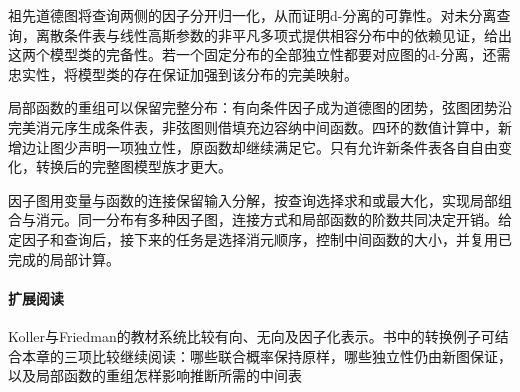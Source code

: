 祖先道德图将查询两侧的因子分开归一化，从而证明d-分离的可靠性。对未分离查询，离散条件表与线性高斯参数的非平凡多项式提供相容分布中的依赖见证，给出这两个模型类的完备性。若一个固定分布的全部独立性都要对应图的d-分离，还需忠实性，将模型类的存在保证加强到该分布的完美映射。

局部函数的重组可以保留完整分布：有向条件因子成为道德图的团势，弦图团势沿完美消元序生成条件表，非弦图则借填充边容纳中间函数。四环的数值计算中，新增边让图少声明一项独立性，原函数却继续满足它。只有允许新条件表各自自由变化，转换后的完整图模型族才更大。

因子图用变量与函数的连接保留输入分解，按查询选择求和或最大化，实现局部组合与消元。同一分布有多种因子图，连接方式和局部函数的阶数共同决定开销。给定因子和查询后，接下来的任务是选择消元顺序，控制中间函数的大小，并复用已完成的局部计算。

\paragraph{扩展阅读}
Koller与Friedman的教材系统比较有向、无向及因子化表示。书中的转换例子可结合本章的三项比较继续阅读：哪些联合概率保持原样，哪些独立性仍由新图保证，以及局部函数的重组怎样影响推断所需的中间表
